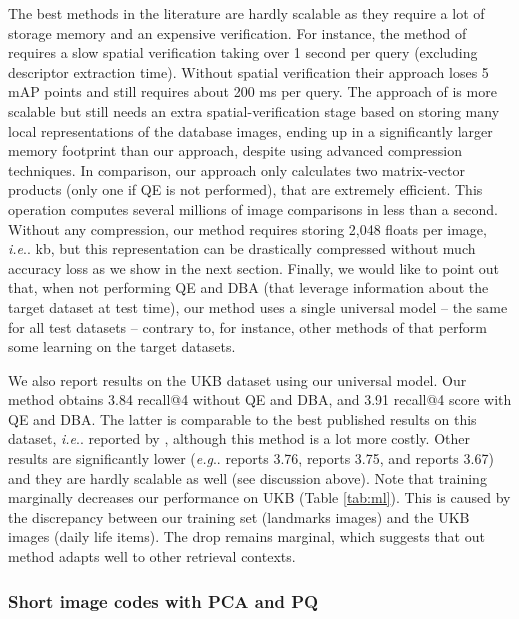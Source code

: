 \documentclass[twocolumn]{svjour3}          \smartqed  \usepackage{graphicx}
\makeatletter
\DeclareRobustCommand\onedot{\futurelet\@let@token\@onedot}
\def\@onedot{\ifx\@let@token.\else.\null\fi\xspace}
\def\eg{\emph{e.g}\onedot} \def\Eg{\emph{E.g}\onedot}
\def\ie{\emph{i.e}\onedot} \def\Ie{\emph{I.e}\onedot}
\makeatother
\begin{document}
The best methods in the literature \citep{Tolias2015b, Azizpour2015} are hardly scalable as they require a lot of storage memory and an expensive verification. For instance, the method of \cite{Tolias2015b} requires a slow spatial verification taking over 1 second per query (excluding descriptor extraction time). Without spatial verification their approach loses 5 mAP points and still requires about 200 ms per query. The approach of \cite{Tolias2016} is more scalable but still needs an extra spatial-verification stage based on storing many local representations of the database images, ending up in a significantly larger memory footprint than our approach, despite using advanced compression techniques. 
In comparison, our approach only calculates two matrix-vector products (only one if QE is not performed), that are extremely efficient.
This operation computes several millions of image comparisons in less than a second. Without any compression, our method requires storing 2,048 floats per image, \ie 8 kb, but this representation can be drastically compressed without much accuracy loss as we show in the next section.
Finally, we would like to point out that, when not performing QE and DBA (that leverage information about the target dataset at test time), our method uses a single universal model -- the same for all test datasets -- contrary to, for instance, other methods of \cite{Danfeng2011, Shen2014, Tolias2015} that perform some learning on the target datasets.

We also report results on the UKB dataset using our universal model. Our method obtains 3.84 recall@4 without QE and DBA, and 3.91 recall@4 score with QE and DBA. The latter is comparable to the best published results on this dataset, \ie 3.85 reported by \cite{Azizpour2015}, although this method is a lot more costly.
Other results are significantly lower (\eg \cite{Paulin2015} reports 3.76, \cite{Deng2013} reports 3.75, and \cite{Tolias2015b} reports 3.67) and they are hardly scalable as well (see discussion above). 
Note that training marginally decreases our performance on UKB (Table \ref{tab:ml}). This is caused by the discrepancy between our training set (landmarks images) and the UKB images (daily life items). The drop remains marginal, which suggests that out method adapts well to other retrieval contexts.



\subsubsection{Short image codes with PCA and PQ}
\label{sub:shortcodes}
\end{document}
